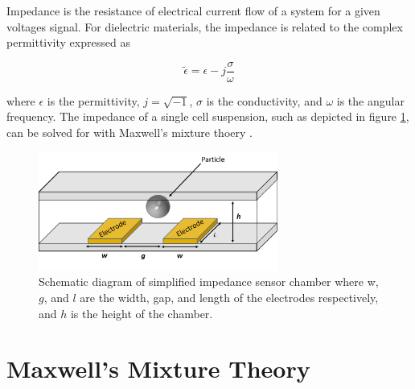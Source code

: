 
\label{apx:apx:app:analytic_impedance_solution}

\par Impedance is the resistance of electrical current flow of a system for a given voltages signal. For dielectric materials, the impedance is related to the complex permittivity expressed as

\begin{equation}
    \tilde{\epsilon} = \epsilon - j\frac{\sigma}{\omega}
\end{equation}

\noindent where $\epsilon$ is the permittivity, $j = \sqrt{-1}$, $\sigma$ is the conductivity, and $\omega$ is the angular frequency. The impedance of a single cell suspension, such as depicted in figure \ref{apx:apx:fig:simplified_IS_apx}, can be solved for with Maxwell's mixture thoery \cite{james_clerk_maxwell_treatise_1892, sun_single-cell_2010}.

\begin{figure}[ht]
 \centering
 \includegraphics[width=0.7\textwidth]{images/cellAndElectrodes.png}
 \caption[Schematic diagram of simplified impedance sensor chamber.]{Schematic diagram of simplified impedance sensor chamber where w, $g$, and $l$ are the width, gap, and length of the electrodes respectively, and $h$ is the height of the chamber.}
 \label{apx:apx:fig:simplified_IS_apx}
 \end{figure}
 
 

\section{Maxwell's Mixture Theory}
 
